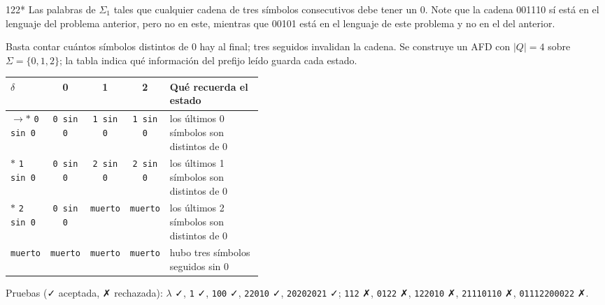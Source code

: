 \documentclass[11pt]{article}
\begin{document}
\begin{ejercicio}{122}{*}
Las palabras de $\Sigma_1$ tales que cualquier cadena de tres símbolos consecutivos debe tener un 0. Note que la cadena 001110 sí está en el lenguaje del problema anterior, pero no en este, mientras que 00101 está en el lenguaje de este problema y no en el del anterior.
\end{ejercicio}
\proc Basta contar cuántos símbolos distintos de 0 hay al final; tres seguidos invalidan la cadena. Se construye un AFD con $|Q| = 4$ sobre $\Sigma = \{0, 1, 2\}$; la tabla indica qué información del prefijo leído guarda cada estado.
\begin{center}\small\begin{tabular}{lcccp{0.42\linewidth}}\toprule
$\delta$ & 0 & 1 & 2 & Qué recuerda el estado \\\midrule
$\to$$*$ \texttt{0 sin 0} & \texttt{0 sin 0} & \texttt{1 sin 0} & \texttt{1 sin 0} & los últimos 0 símbolos son distintos de 0 \\
$*$ \texttt{1 sin 0} & \texttt{0 sin 0} & \texttt{2 sin 0} & \texttt{2 sin 0} & los últimos 1 símbolos son distintos de 0 \\
$*$ \texttt{2 sin 0} & \texttt{0 sin 0} & \texttt{muerto} & \texttt{muerto} & los últimos 2 símbolos son distintos de 0 \\
 \texttt{muerto} & \texttt{muerto} & \texttt{muerto} & \texttt{muerto} & hubo tres símbolos seguidos sin 0 \\
\bottomrule\end{tabular}\end{center}
Pruebas (✓ aceptada, ✗ rechazada): $\lambda$ ✓, \texttt{1} ✓, \texttt{100} ✓, \texttt{22010} ✓, \texttt{20202021} ✓; \texttt{112} ✗, \texttt{0122} ✗, \texttt{122010} ✗, \texttt{21110110} ✗, \texttt{01112200022} ✗.
\end{document}

